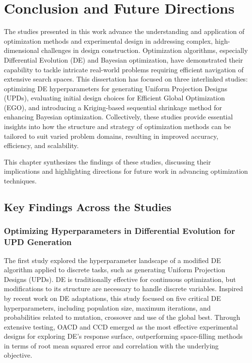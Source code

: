 \chapter{Conclusion and Future Directions}

The studies presented in this work advance the understanding and application of optimization methods and experimental design in addressing complex, high-dimensional challenges in design construction. Optimization algorithms, especially Differential Evolution (DE) and Bayesian optimization, have demonstrated their capability to tackle intricate real-world problems requiring efficient navigation of extensive search spaces. This dissertation has focused on three interlinked studies: optimizing DE hyperparameters for generating Uniform Projection Designs (UPDs), evaluating initial design choices for Efficient Global Optimization (EGO), and introducing a Kriging-based sequential shrinkage method for enhancing Bayesian optimization. Collectively, these studies provide essential insights into how the structure and strategy of optimization methods can be tailored to suit varied problem domains, resulting in improved accuracy, efficiency, and scalability. 

This chapter synthesizes the findings of these studies, discussing their implications and highlighting directions for future work in advancing optimization techniques.

\section{Key Findings Across the Studies}

\subsection{Optimizing Hyperparameters in Differential Evolution for UPD Generation}
The first study explored the hyperparameter landscape of a modified DE algorithm applied to discrete tasks, such as generating Uniform Projection Designs (UPDs). DE is traditionally effective for continuous optimization, but modifications to its structure are necessary to handle discrete variables. Inspired by recent work on DE adaptations, this study focused on five critical DE hyperparameters, including population size, maximum iterations, and probabilities related to mutation, crossover and use of the global best. Through extensive testing, OACD and CCD emerged as the most effective experimental designs for exploring DE's response surface, outperforming space-filling methods in terms of root mean squared error and correlation with the underlying objective.

